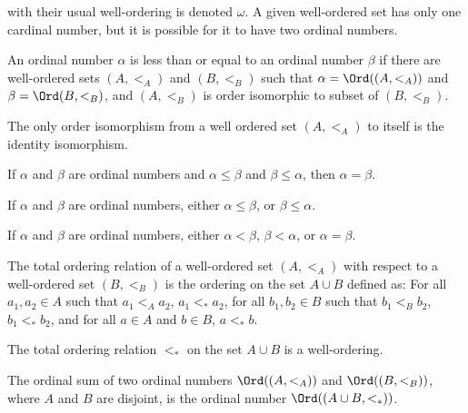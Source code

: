         with their usual well-ordering is denoted $\omega$.
        A given well-ordered set has only one cardinal number,
        but it is possible for it to have two ordinal numbers.
        \begin{definition}
            An ordinal number $\alpha$ is less than or equal to an ordinal
            number $\beta$ if there are well-ordered sets $(A,<_{A})$ and
            $(B,<_{B})$ such that $\alpha=\Ord((A,<_{A}))$ and
            $\beta=\Ord(B,<_{B})$, and $(A,<_{B})$ is order isomorphic to
            subset of $(B,<_{B})$.
        \end{definition}
        \begin{theorem}
            The only order isomorphism from a well ordered set $(A,<_{A})$ to
            itself is the identity isomorphism.
        \end{theorem}
        \begin{theorem}
            If $\alpha$ and $\beta$ are ordinal numbers and
            ${\alpha}\leq{\beta}$ and ${\beta}\leq{\alpha}$,
            then $\alpha=\beta$.
        \end{theorem}
        \begin{theorem}
            If $\alpha$ and $\beta$ are ordinal numbers, either
            ${\alpha}\leq{\beta}$, or ${\beta}\leq{\alpha}$.
        \end{theorem}
        \begin{theorem}
            If $\alpha$ and $\beta$ are ordinal numbers, either
            $\alpha<\beta$, $\beta<\alpha$, or $\alpha=\beta$.
        \end{theorem}
        \begin{definition}
            The total ordering relation of a well-ordered set $(A,<_{A})$
            with respect
           to a well-ordered set $(B,<_{B})$ is the ordering
           on the set ${A}\cup{B}$ defined as: For all
           $a_{1},a_{2}\in{A}$ such that $a_{1}<_{A}a_{2}$,
           $a_{1}<_{*}a_{2}$, for all $b_{1},b_{2}\in{B}$
           such that $b_{1}<_{B}b_{2}$, $b_{1}<_{*}b_{2}$,
           and for all ${a}\in{A}$ and ${b}\in{B}$,
           ${a}<_{*}{b}$.
        \end{definition}
        \begin{theorem}
           The total ordering relation $<_{*}$ on the set
           ${A}\cup{B}$ is a well-ordering.
        \end{theorem}
        \begin{definition}
            The ordinal sum of two ordinal numbers $\Ord((A,<_{A}))$ and
            $\Ord((B,<_{B}))$, where $A$ and $B$ are disjoint, is the ordinal
            number $\Ord(({A}\cup{B},<_{*}))$.
        \end{definition}
